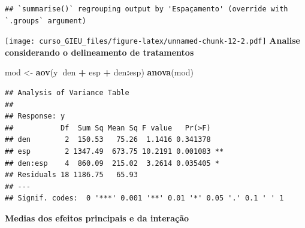 \documentclass[
]{book}
\newenvironment{Shaded}{\begin{snugshade}}{\end{snugshade}}
\newcommand{\DataTypeTok}[1]{\textcolor[rgb]{0.13,0.29,0.53}{#1}}
\newcommand{\KeywordTok}[1]{\textcolor[rgb]{0.13,0.29,0.53}{\textbf{#1}}}
\newcommand{\NormalTok}[1]{#1}
\newcommand{\OperatorTok}[1]{\textcolor[rgb]{0.81,0.36,0.00}{\textbf{#1}}}
\newcommand{\StringTok}[1]{\textcolor[rgb]{0.31,0.60,0.02}{#1}}
\begin{document}
\begin{Shaded}
\end{Shaded}

\begin{verbatim}
## `summarise()` regrouping output by 'Espaçamento' (override with `.groups` argument)
\end{verbatim}

\texttt{[image: curso\_GIEU\_files/figure-latex/unnamed-chunk-12-2.pdf]}
\textbf{Analise considerando o delineamento de tratamentos}

\begin{Shaded}
\begin{Highlighting}[]
\NormalTok{mod <-}\StringTok{ }\KeywordTok{aov}\NormalTok{(y}\OperatorTok{~}\NormalTok{den }\OperatorTok{+}\StringTok{ }\NormalTok{esp }\OperatorTok{+}\StringTok{ }\NormalTok{den}\OperatorTok{:}\NormalTok{esp)}
\KeywordTok{anova}\NormalTok{(mod)}
\end{Highlighting}
\end{Shaded}

\begin{verbatim}
## Analysis of Variance Table
## 
## Response: y
##           Df  Sum Sq Mean Sq F value   Pr(>F)   
## den        2  150.53   75.26  1.1416 0.341378   
## esp        2 1347.49  673.75 10.2191 0.001083 **
## den:esp    4  860.09  215.02  3.2614 0.035405 * 
## Residuals 18 1186.75   65.93                    
## ---
## Signif. codes:  0 '***' 0.001 '**' 0.01 '*' 0.05 '.' 0.1 ' ' 1
\end{verbatim}

\textbf{Medias dos efeitos principais e da interação}
\end{document}
